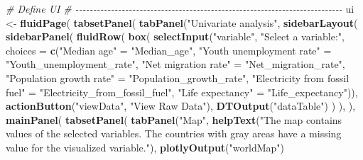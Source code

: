 \documentclass[
]{article}
\newenvironment{Shaded}{\begin{snugshade}}{\end{snugshade}}
\newcommand{\AttributeTok}[1]{\textcolor[rgb]{0.13,0.29,0.53}{#1}}
\newcommand{\CommentTok}[1]{\textcolor[rgb]{0.56,0.35,0.01}{\textit{#1}}}
\newcommand{\FunctionTok}[1]{\textcolor[rgb]{0.13,0.29,0.53}{\textbf{#1}}}
\newcommand{\NormalTok}[1]{#1}
\newcommand{\OtherTok}[1]{\textcolor[rgb]{0.56,0.35,0.01}{#1}}
\newcommand{\StringTok}[1]{\textcolor[rgb]{0.31,0.60,0.02}{#1}}
\begin{document}
\begin{Shaded}
\begin{Highlighting}[]
\CommentTok{\# Define UI}
\CommentTok{\# {-}{-}{-}{-}{-}{-}{-}{-}{-}{-}{-}{-}{-}{-}{-}{-}{-}{-}{-}{-}{-}{-}{-}{-}{-}{-}{-}{-}{-}{-}{-}{-}{-}{-}{-}{-}{-}{-}{-}{-}{-}{-}{-}{-}{-}{-}{-}{-}{-}{-}{-}{-}{-}{-}{-}{-}{-}{-}{-}{-}{-}{-}{-}{-}{-}{-}{-}{-}{-}{-}{-}{-}{-}{-}{-}}
\NormalTok{ui }\OtherTok{\textless{}{-}} \FunctionTok{fluidPage}\NormalTok{(}
  \FunctionTok{tabsetPanel}\NormalTok{(}
    \FunctionTok{tabPanel}\NormalTok{(}\StringTok{"Univariate analysis"}\NormalTok{,}
      \FunctionTok{sidebarLayout}\NormalTok{(}
        \FunctionTok{sidebarPanel}\NormalTok{(}
          \FunctionTok{fluidRow}\NormalTok{(}
            \FunctionTok{box}\NormalTok{(}
              \FunctionTok{selectInput}\NormalTok{(}\StringTok{"variable"}\NormalTok{, }\StringTok{"Select a variable:"}\NormalTok{,}
                         \AttributeTok{choices =} \FunctionTok{c}\NormalTok{(}\StringTok{"Median age"}                   \OtherTok{=} \StringTok{"Median\_age"}\NormalTok{,}
                                     \StringTok{"Youth unemployment rate"}      \OtherTok{=} \StringTok{"Youth\_unemployment\_rate"}\NormalTok{,}
                                     \StringTok{"Net migration rate"}           \OtherTok{=} \StringTok{"Net\_migration\_rate"}\NormalTok{,}
                                     \StringTok{"Population growth rate"}       \OtherTok{=} \StringTok{"Population\_growth\_rate"}\NormalTok{,}
                                     \StringTok{"Electricity from fossil fuel"} \OtherTok{=} \StringTok{"Electricity\_from\_fossil\_fuel"}\NormalTok{,}
                                     \StringTok{"Life expectancy"}              \OtherTok{=} \StringTok{"Life\_expectancy"}\NormalTok{)),}
              \FunctionTok{actionButton}\NormalTok{(}\StringTok{"viewData"}\NormalTok{, }\StringTok{"View Raw Data"}\NormalTok{),}
              \FunctionTok{DTOutput}\NormalTok{(}\StringTok{"dataTable"}\NormalTok{)}
\NormalTok{            )}
\NormalTok{          ),}
\NormalTok{        ),}
        \FunctionTok{mainPanel}\NormalTok{(}
          \FunctionTok{tabsetPanel}\NormalTok{(}
            \FunctionTok{tabPanel}\NormalTok{(}\StringTok{"Map"}\NormalTok{,}
               \FunctionTok{helpText}\NormalTok{(}\StringTok{"The map contains values of the selected variables. }
\StringTok{                        The countries with gray areas have a missing value }
\StringTok{                        for the visualized variable."}\NormalTok{),}
               \FunctionTok{plotlyOutput}\NormalTok{(}\StringTok{"worldMap"}\NormalTok{)}

\end{Highlighting}
\end{Shaded}
\end{document}
